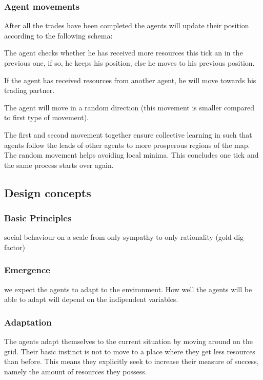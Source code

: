 \documentclass{JASSS}
\begin{document}
\subsubsection{Agent movements}
		After all the trades have been completed the agents will update their position according to the following schema:
\begin{enumerate*}
	\item
		The agent checks whether he has received more resources this tick an in the previous one, if so, he keeps his position, else he moves to his previous position.

	\item
		If the agent has received resources from another agent, he will move towards his trading partner.

	\item
		The agent will move in a random direction (this movement is smaller compared to first type of movement). 
\end{enumerate*}
The first and second movement together ensure collective learning in such that agents follow the leads of other agents to more prosperous regions of the map. The random movement helps avoiding local minima. This concludes one tick and the same process starts over again.


\subsection{Design concepts}

\subsubsection{Basic Principles}
	social behaviour on a scale from only sympathy to only rationality (gold-dig-factor)

\subsubsection{Emergence}
	we expect the agents to adapt to the environment. How well the agents will be able to adapt will depend on the indipendent variables.

\subsubsection{Adaptation}
	The agents adapt themselves to the current situation by moving around on the grid. Their basic instinct is not to move to a place where they get less resources than before. This means they explicitly seek to increase their measure of success, namely the amount of resources they possess.
\end{document}
